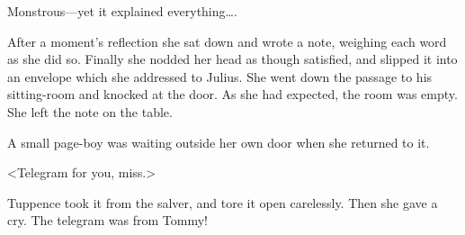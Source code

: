 Monstrous—yet it explained everything\dots.

After a moment's reflection she sat down and wrote a note, weighing each word as she did so. Finally she nodded her head as though satisfied, and slipped it into an envelope which she addressed to Julius. She went down the passage to his sitting-room and knocked at the door. As she had expected, the room was empty. She left the note on the table.

A small page-boy was waiting outside her own door when she returned to it.

<Telegram for you, miss.>

Tuppence took it from the salver, and tore it open carelessly. Then she gave a cry. The telegram was from Tommy! 